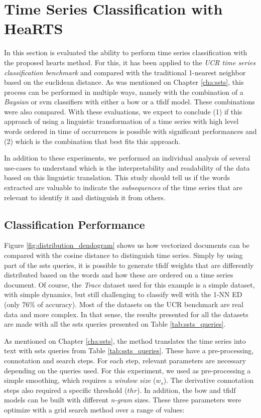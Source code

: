 \section{Time Series Classification with HeaRTS}

In this section is evaluated the ability to perform time series classification with the proposed \gls{hearts} method. For this, it has been applied to the \textit{UCR time series classification benchmark} and compared with the traditional 1-nearest neighbor based on the euclidean distance. As was mentioned on Chapter \ref{cha:ssts}, this process can be performed in multiple ways, namely with the combination of a \textit{Baysian} or \gls{svm} classifiers with either a \gls{bow} or a \gls{tfidf} model. These combinations were also compared. With these evaluations, we expect to conclude (1) if this approach of using a linguistic transformation of a time series with high level words ordered in time of occurrences is possible with significant performances and (2) which is the combination that best fits this approach.
\par
In addition to these experiments, we performed an individual analysis of several use-cases to understand which is the interpretability and readability of the data based on this linguistic translation. This study should tell us if the words extracted are valuable to indicate the \textit{subsequences} of the time series that are relevant to identify it and distinguish it from others. 

\subsection{Classification Performance}

Figure \ref{fig:distribution_dendogram} shows us how vectorized documents can be compared with the cosine distance to distinguish time series. Simply by using part of the \gls{ssts} queries, it is possible to generate \gls{tfidf} weights that are differently distributed based on the words and how these are ordered on a time series document. Of course, the \textit{Trace} dataset used for this example is a simple dataset, with simple dynamics, but still challenging to classify well with the 1-NN ED (only 76\% of accuracy). Most of the datasets on the UCR benchmark are real data and more complex. In that sense, the results presented for all the datasets are made with all the \gls{ssts} queries presented on Table \ref{tab:ssts_queries}.
\par
As mentioned on Chapter \ref{cha:ssts}, the method translates the time series into text with \gls{ssts} queries from Table \ref{tab:ssts_queries}. These have a pre-processing, connotation and search steps. For each step, relevant parameters are necessary depending on the queries used. For this experiment, we used as pre-processing a simple smoothing, which requires a \textit{window size} ($w_s$). The derivative connotation steps also required a specific threshold ($thr$). In addition, the \gls{bow} and \gls{tfidf} models can be built with different \textit{n-gram} sizes. These three parameters were optimize with a grid search method over a range of values:

